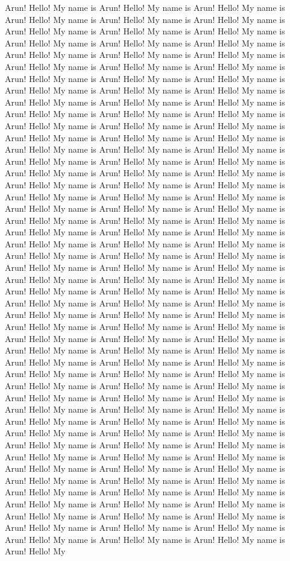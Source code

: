 \documentclass[10pt,a4paper,oneside]{article}
\begin{document}
Arun!	Hello! My name is Arun!	Hello! My name is Arun!	Hello! My name is Arun!	Hello! My name is Arun!	Hello! My name is Arun!	Hello! My name is Arun!	Hello! My name is Arun!	Hello! My name is Arun!	Hello! My name is Arun!	Hello! My name is Arun!	Hello! My name is Arun!	Hello! My name is Arun!	Hello! My name is Arun!	Hello! My name is Arun!	Hello! My name is Arun!	Hello! My name is Arun! 	Hello! My name is Arun!	Hello! My name is Arun!	Hello! My name is Arun!	Hello! My name is Arun!	Hello! My name is Arun!	Hello! My name is Arun!	Hello! My name is Arun!	Hello! My name is Arun!	Hello! My name is Arun!	Hello! My name is Arun!	Hello! My name is Arun!	Hello! My name is Arun!	Hello! My name is Arun!	Hello! My name is Arun!	Hello! My name is Arun!	Hello! My name is Arun!	Hello! My name is Arun!	Hello! My name is Arun!	Hello! My name is Arun!	Hello! My name is Arun! 	Hello! My name is Arun!	Hello! My name is Arun!	Hello! My name is Arun!	Hello! My name is Arun!	Hello! My name is Arun!	Hello! My name is Arun!	Hello! My name is Arun!	Hello! My name is Arun!	Hello! My name is Arun!	Hello! My name is Arun!	Hello! My name is Arun!	Hello! My name is Arun!	Hello! My name is Arun!	Hello! My name is Arun!	Hello! My name is Arun!	Hello! My name is Arun!	Hello! My name is Arun!	Hello! My name is Arun!	Hello! My name is Arun!	Hello! My name is Arun! 	Hello! My name is Arun!	Hello! My name is Arun!	Hello! My name is Arun!	Hello! My name is Arun!	Hello! My name is Arun!	Hello! My name is Arun!	Hello! My name is Arun!	Hello! My name is Arun!	Hello! My name is Arun!	Hello! My name is Arun!	Hello! My name is Arun!	Hello! My name is Arun!	Hello! My name is Arun!	Hello! My name is Arun!	Hello! My name is Arun!	Hello! My name is Arun!	Hello! My name is Arun!	Hello! My name is Arun!	Hello! My name is Arun!	Hello! My name is Arun! 	Hello! My name is Arun!	Hello! My name is Arun!	Hello! My name is Arun!	Hello! My name is Arun!	Hello! My name is Arun!	Hello! My name is Arun!	Hello! My name is Arun!	Hello! My name is Arun!	Hello! My name is Arun!	Hello! My name is Arun!	Hello! My name is Arun!	Hello! My name is Arun!	Hello! My name is Arun!	Hello! My name is Arun!	Hello! My name is Arun!	Hello! My name is Arun!	Hello! My name is Arun!	Hello! My name is Arun!	Hello! My name is Arun!	Hello! My name is Arun! 	Hello! My name is Arun!	Hello! My name is Arun!	Hello! My name is Arun!	Hello! My name is Arun!	Hello! My name is Arun!	Hello! My name is Arun!	Hello! My name is Arun!	Hello! My name is Arun!	Hello! My name is Arun!	Hello! My name is Arun!	Hello! My name is Arun!	Hello! My name is Arun!	Hello! My name is Arun!	Hello! My name is Arun!	Hello! My name is Arun!	Hello! My name is Arun!	Hello! My name is Arun!	Hello! My name is Arun!	Hello! My name is Arun!	Hello! My name is Arun! 	Hello! My name is Arun!	Hello! My name is Arun!	Hello! My name is Arun!	Hello! My name is Arun!	Hello! My name is Arun!	Hello! My name is Arun!	Hello! My name is Arun!	Hello! My name is Arun!	Hello! My name is Arun!	Hello! My name is Arun!	Hello! My name is Arun!	Hello! My name is Arun!	Hello! My name is Arun!	Hello! My name is Arun!	Hello! My name is Arun!	Hello! My name is Arun!	Hello! My name is Arun!	Hello! My name is Arun!	Hello! My name is Arun!	Hello! My name is Arun! 	Hello! My name is Arun!	Hello! My name is Arun!	Hello! My 
\end{document}
